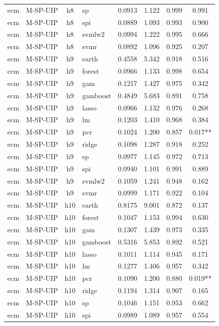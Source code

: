 \begin{ThreePartTable}
\begin{longtable}[t]{llclcccc}
ecm & M-SP-UIP & h8 & sp & 0.0913 & 1.122 & 0.999 & 0.991\\
ecm & M-SP-UIP & h8 & spi & 0.0889 & 1.093 & 0.993 & 0.900\\
ecm & M-SP-UIP & h8 & svmlw2 & 0.0994 & 1.222 & 0.995 & 0.666\\
ecm & M-SP-UIP & h8 & svmr & 0.0892 & 1.096 & 0.925 & 0.207\\
\addlinespace
ecm & M-SP-UIP & h9 & earth & 0.4558 & 5.342 & 0.918 & 0.516\\
ecm & M-SP-UIP & h9 & forest & 0.0966 & 1.133 & 0.998 & 0.654\\
ecm & M-SP-UIP & h9 & gam & 0.1217 & 1.427 & 0.975 & 0.342\\
ecm & M-SP-UIP & h9 & gamboost & 0.4849 & 5.683 & 0.891 & 0.758\\
ecm & M-SP-UIP & h9 & lasso & 0.0966 & 1.132 & 0.976 & 0.268\\
ecm & M-SP-UIP & h9 & lm & 0.1203 & 1.410 & 0.968 & 0.384\\
ecm & M-SP-UIP & h9 & pcr & 0.1024 & 1.200 & 0.857 & 0.017**\\
ecm & M-SP-UIP & h9 & ridge & 0.1098 & 1.287 & 0.918 & 0.252\\
ecm & M-SP-UIP & h9 & sp & 0.0977 & 1.145 & 0.972 & 0.713\\
ecm & M-SP-UIP & h9 & spi & 0.0940 & 1.101 & 0.991 & 0.889\\
ecm & M-SP-UIP & h9 & svmlw2 & 0.1059 & 1.241 & 0.948 & 0.162\\
ecm & M-SP-UIP & h9 & svmr & 0.0999 & 1.171 & 0.922 & 0.104\\
\addlinespace
ecm & M-SP-UIP & h10 & earth & 0.8175 & 9.001 & 0.872 & 0.137\\
ecm & M-SP-UIP & h10 & forest & 0.1047 & 1.153 & 0.994 & 0.630\\
ecm & M-SP-UIP & h10 & gam & 0.1307 & 1.439 & 0.973 & 0.335\\
ecm & M-SP-UIP & h10 & gamboost & 0.5316 & 5.853 & 0.892 & 0.521\\
ecm & M-SP-UIP & h10 & lasso & 0.1011 & 1.114 & 0.945 & 0.171\\
ecm & M-SP-UIP & h10 & lm & 0.1277 & 1.406 & 0.957 & 0.342\\
ecm & M-SP-UIP & h10 & pcr & 0.1090 & 1.200 & 0.880 & 0.019**\\
ecm & M-SP-UIP & h10 & ridge & 0.1194 & 1.314 & 0.907 & 0.165\\
ecm & M-SP-UIP & h10 & sp & 0.1046 & 1.151 & 0.953 & 0.662\\
ecm & M-SP-UIP & h10 & spi & 0.0989 & 1.089 & 0.957 & 0.554\\

\end{longtable}
\end{ThreePartTable}
